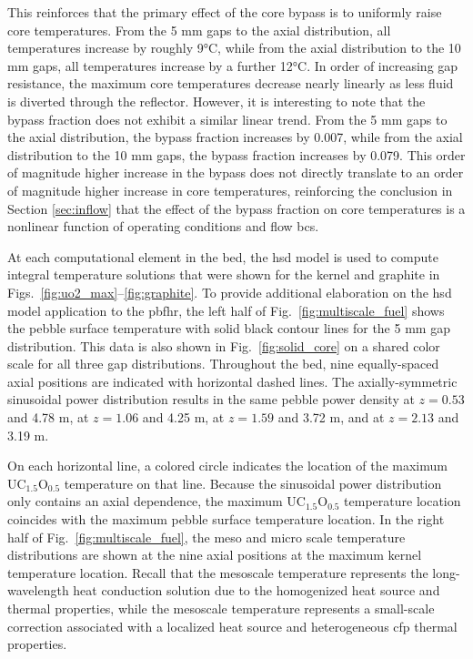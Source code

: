 This reinforces that the primary effect of the core bypass is to uniformly raise core temperatures. From the 5 \si{\milli\meter} gaps to the axial distribution, all temperatures increase by roughly 9\si{\celsius}, while from the axial distribution to the 10 \si{\milli\meter} gaps, all temperatures increase by a further 12\si{\celsius}. In order of increasing gap resistance, the maximum core temperatures decrease nearly linearly as less fluid is diverted through the reflector. However, it is interesting to note that the bypass fraction does not exhibit a similar linear trend. From the 5 \si{\milli\meter} gaps to the axial distribution, the bypass fraction increases by 0.007, while from the axial distribution to the 10 \si{\milli\meter} gaps, the bypass fraction increases by 0.079. This order of magnitude higher increase in the bypass does not directly translate to an order of magnitude higher increase in core temperatures, reinforcing the conclusion in Section \ref{sec:inflow} that the effect of the bypass fraction on core temperatures is a nonlinear function of operating conditions and flow \glspl{bc}. 

At each computational element in the bed, the \gls{hsd} model is used to compute integral temperature solutions that were shown for the kernel and graphite in Figs.\ \ref{fig:uo2_max}--\ref{fig:graphite}. To provide additional elaboration on the \gls{hsd} model application to the \gls{pbfhr}, the left half of Fig.\ \ref{fig:multiscale_fuel} shows the pebble surface temperature with solid black contour lines for the 5 \si{\milli\meter} gap distribution. This data is also shown in Fig.\ \ref{fig:solid_core} on a shared color scale for all three gap distributions. Throughout the bed, nine equally-spaced axial positions are indicated with horizontal dashed lines. The axially-symmetric sinusoidal power distribution results in the same pebble power density at \(z=0.53\) and 4.78 \si{\meter}, at \(z=1.06\) and 4.25 \si{\meter}, at \(z=1.59\) and 3.72 \si{\meter}, and at \(z=2.13\) and 3.19 \si{\meter}.

On each horizontal line, a colored circle indicates the location of the maximum UC$_{1.5}$O$_{0.5}$ temperature on that line. Because the sinusoidal power distribution only contains an axial dependence, the maximum UC$_{1.5}$O$_{0.5}$ temperature location coincides with the maximum pebble surface temperature location. In the right half of Fig.\ \ref{fig:multiscale_fuel}, the meso and micro scale temperature distributions are shown at the nine axial positions at the maximum kernel temperature location. Recall that the mesoscale temperature represents the long-wavelength heat conduction solution due to the homogenized heat source and thermal properties, while the mesoscale temperature represents a small-scale correction associated with a localized heat source and heterogeneous \gls{cfp} thermal properties. 

